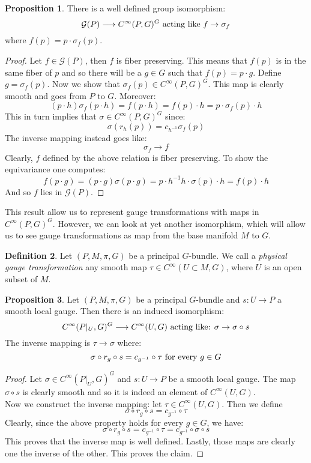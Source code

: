 \documentclass[12pt,a4paper]{report}
\theoremstyle{definition}
\newtheorem{Def}{Definition}[chapter]
\theoremstyle{Theorem}
\newtheorem{Prop}[Def]{Proposition}
\theoremstyle{definition}
\theoremstyle{definition}
\begin{document}
	\begin{Prop}
		There is a well defined group isomorphism:
		$$\mathcal{G}(P)\longrightarrow C^\infty(P,G)^G\hbox{ acting like }f\rightarrow \sigma_f$$
		where $f(p)=p\cdot \sigma_f(p)$.
	\end{Prop}
	\begin{proof}
		Let $f\in\mathcal{G}(P)$, then $f$ is fiber preserving. This means that $f(p)$ is in the same fiber of $p$ and so there will be a $g\in G$ such that $f(p)=p\cdot g$. Define $g=\sigma_f(p)$. Now we show that $\sigma_f(p)\in C^\infty(P,G)^G$. This map is clearly smooth and goes from $P$ to $G$. Moreover:
		$$(p\cdot h)\sigma_f(p\cdot h)=f(p\cdot h)=f(p)\cdot h=p\cdot \sigma_f(p)\cdot h$$
		This in turn implies that $\sigma\in C^\infty(P,G)^G$ since:
		$$\sigma(r_h(p))=c_{h^{-1}}\sigma_f(p)$$
		The inverse mapping instead goes like:
		$$\sigma_f\rightarrow f$$
		Clearly, $f$ defined by the above relation is fiber preserving. To show the equivariance one computes:
		$$f(p\cdot g)=(p\cdot g)\sigma(p\cdot g)=p\cdot h^{-1}h\cdot\sigma(p)\cdot h=f(p)\cdot h$$
		And so $f$ lies in $\mathcal{G}(P)$.
	\end{proof}
	This result allow us to represent gauge transformations with maps in $C^\infty(P,G)^G$. However, we can look at yet another isomorphism, which will allow us to see gauge transformations as map from the base manifold $M$ to $G$.
	\begin{Def}
		Let $(P,M,\pi,G)$ be a principal $G$-bundle. We call a \textit{physical gauge transformation} any smooth map $\tau\in C^\infty(U\subset M,G)$, where $U$ is an open subset of $M$.
	\end{Def} 
	\begin{Prop}\label{Prop_7.1.2}
		Let $(P,M,\pi,G)$ be a principal $G$-bundle and $s:U\rightarrow P$ a smooth local gauge. Then there is an induced isomorphism:
		$$C^\infty(P|_U,G)^G\longrightarrow C^\infty(U,G)\hbox{ acting like: }\sigma\rightarrow \sigma\circ s$$
		The inverse mapping is $\tau\rightarrow \sigma$ where: 
		$$\sigma\circ r_g\circ s=c_{g^{-1}}\circ\tau\hbox{ for every } g\in G$$
	\end{Prop}
	\begin{proof}
		Let $\sigma\in C^\infty(P|_U,G)^G$ and $s:U\rightarrow P$ be a smooth local gauge. The map $\sigma\circ s$ is clearly smooth and so it is indeed an element of $C^\infty(U,G)$.\\
		Now we construct the inverse mapping: let $\tau\in C^\infty(U,G)$. Then we define 
		$$\sigma\circ r_g\circ s=c_{g^{-1}}\circ\tau$$
		Clearly, since the above property holds for every $g\in G$, we have:
		$$\sigma\circ r_g\circ s=c_{g^{-1}}\circ \tau=c_{g^{-1}}\circ \sigma\circ s$$
		This proves that the inverse map is well defined. Lastly, those maps are clearly one the inverse of the other. This proves the claim.
	\end{proof}
\end{document}
